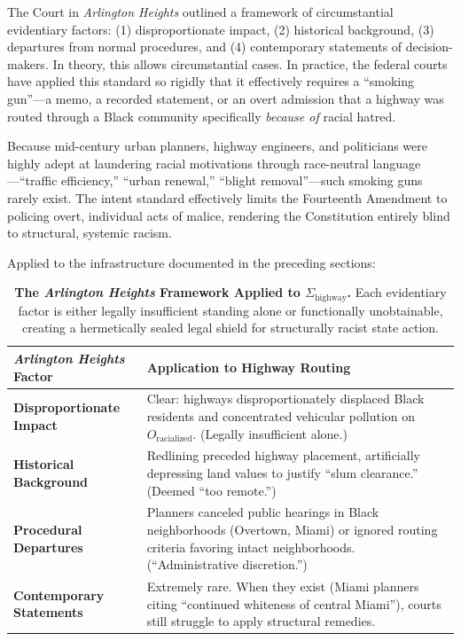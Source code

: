\documentclass[12pt,openany]{book}
\begin{document}
The Court in \textit{Arlington Heights} outlined a framework of circumstantial evidentiary factors: (1) disproportionate impact, (2) historical background, (3) departures from normal procedures, and (4) contemporary statements of decision-makers. In theory, this allows circumstantial cases. In practice, the federal courts have applied this standard so rigidly that it effectively requires a ``smoking gun''---a memo, a recorded statement, or an overt admission that a highway was routed through a Black community specifically \textit{because of} racial hatred.

Because mid-century urban planners, highway engineers, and politicians were highly adept at laundering racial motivations through race-neutral language---``traffic efficiency,'' ``urban renewal,'' ``blight removal''---such smoking guns rarely exist. The intent standard effectively limits the Fourteenth Amendment to policing overt, individual acts of malice, rendering the Constitution entirely blind to structural, systemic racism.

Applied to the infrastructure documented in the preceding sections:

\begin{table}[htbp]
\centering
\small
\renewcommand{\arraystretch}{1.4}
\begin{tabular}{>{\raggedright}p{5.5cm} >{\raggedright\arraybackslash}p{7.5cm}}
\toprule
\textbf{\textit{Arlington Heights} Factor} & \textbf{Application to Highway Routing} \\
\midrule
\textbf{Disproportionate Impact} & Clear: highways disproportionately displaced Black residents and concentrated vehicular pollution on $O_{\text{racialized}}$. (Legally insufficient alone.) \\
\textbf{Historical Background} & Redlining preceded highway placement, artificially depressing land values to justify ``slum clearance.'' (Deemed ``too remote.'') \\
\textbf{Procedural Departures} & Planners canceled public hearings in Black neighborhoods (Overtown, Miami) or ignored routing criteria favoring intact neighborhoods. (``Administrative discretion.'') \\
\textbf{Contemporary Statements} & Extremely rare. When they exist (Miami planners citing ``continued whiteness of central Miami''), courts still struggle to apply structural remedies. \\
\bottomrule
\end{tabular}
\caption{\textbf{The \textit{Arlington Heights} Framework Applied to $\Sigma_{\text{highway}}$.} Each evidentiary factor is either legally insufficient standing alone or functionally unobtainable, creating a hermetically sealed legal shield for structurally racist state action.}
\label{tab:arlington_heights}
\end{table}
\end{document}
